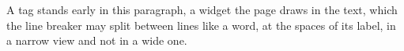 A tag  stands early in this paragraph, a widget the
page draws in the text, which the line breaker may split between lines like
a word, at the spaces of its label, in a narrow view and not in a wide one.
